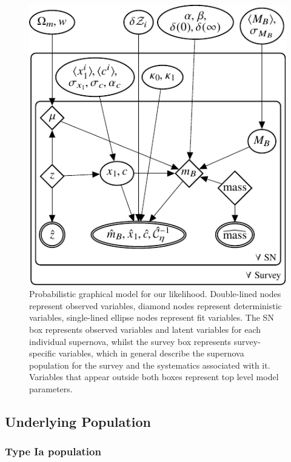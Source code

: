 \documentclass[a4paper,fleqn,usenatbib,manuscript]{emulateapj}
\begin{document}
 \begin{figure}
 	\begin{center}
 		\includegraphics[width=\columnwidth]{tikz-figure0.pdf}
 	\end{center}
 	\caption{Probabilistic graphical model for our likelihood. Double-lined nodes represent observed variables, diamond nodes represent deterministic variables, single-lined ellipse nodes represent fit variables. The SN box represents observed variables and latent variables for each individual supernova, whilst the survey box represents survey-specific variables, which in general describe the supernova population for the survey and the systematics associated with it. Variables that appear outside both boxes represent top level model parameters.}
 	\label{fig:pgm}
 \end{figure}




\subsection{Underlying Population}

\subsubsection{Type Ia population} 
\label{sec:underlying}
\end{document}
